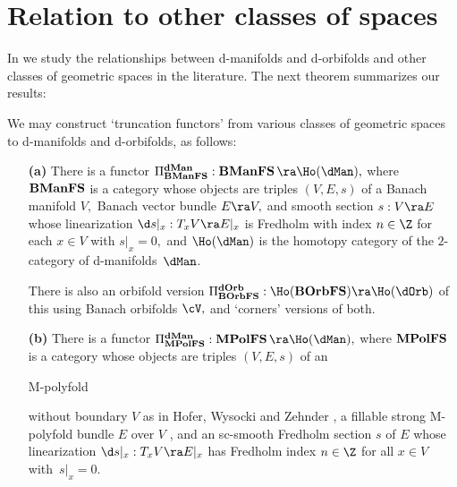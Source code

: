 \documentclass{article}
\begin{document}
\section[Relation to other classes of spaces in
mathematics]{Relation to other classes of spaces}
\label{ds16}

In \cite[Chap.~14]{Joyc6} we study the relationships between
d-manifolds and d-orbifolds and other classes of geometric spaces in
the literature. The next theorem summarizes our
results:

\begin{thm} We may construct `truncation functors' from various
classes of geometric spaces to d-manifolds and d-orbifolds, as
follows:
\begin{itemize}
\setlength{\itemsep}{0pt}
\setlength{\parsep}{0pt}
\item[{\bf(a)}] There is a functor\/ $\Pi_{\bf BManFS}^{\bf
dMan}:\mathop{\bf BManFS}\ra\Ho(\dMan),$ where $\mathop{\bf
BManFS}$ is a category whose objects are triples $(V,E,s)$ of a
Banach manifold $V,$ Banach vector bundle $E\ra V,$ and smooth
section $s:V\ra E$ whose linearization $\d s\vert_x:T_xV\ra
E\vert_x$ is Fredholm with index $n\in\Z$ for each $x\in V$
with\/ $s\vert_x=0,$ and\/ $\Ho(\dMan)$ is the homotopy
category of the $2$-category
of d-manifolds\/~$\dMan$.

There is also an orbifold version $\Pi_{\bf BOrbFS}^{\bf
dOrb}:\Ho(\mathop{\bf BOrbFS})\ra\Ho(\dOrb)$ of this using
Banach orbifolds $\cV,$ and `corners' versions of
both.
\item[{\bf(b)}] There is a functor\/ $\Pi_{\bf MPolFS}^{\bf
dMan}:\mathop{\bf MPolFS}\ra\Ho(\dMan),$ where $\mathop{\bf
MPolFS}$ is a category whose objects are triples $(V,E,s)$ of an
\begin{bfseries}M-polyfold\end{bfseries} without boundary\/ $V$ as in Hofer, Wysocki and
Zehnder\/ {\rm \cite[\S 3.3]{HWZ1},}
a fillable strong M-polyfold bundle $E$ over\/ $V$ {\rm \cite[\S
4.3]{HWZ1},} and an sc-smooth Fredholm section $s$ of\/ $E$ {\rm
\cite[\S 4.4]{HWZ1}} whose linearization $\d s\vert_x:T_xV\ra
E\vert_x$ {\rm \cite[\S 4.4]{HWZ1}} has Fredholm index\/
$n\in\Z$ for all\/ $x\in V$ with\/~$s\vert_x=0$.


\end{itemize}
\end{thm}
\end{document}
